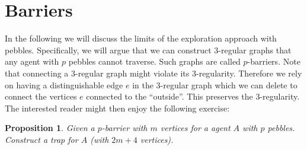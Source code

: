 \documentclass[draft,oneside]{scrartcl}
\newtheorem{prop}{Proposition}
\begin{document}
\section{Barriers}
In the following we will discuss the limits of the exploration approach with
pebbles. Specifically, we will argue that we can construct 3-regular graphs
that any agent with $p$ pebbles cannot traverse. Such graphs are called
$p$-barriers.
Note that connecting a 3-regular graph might violate its 3-regularity.
Therefore we rely on having a distinguishable edge $e$ in the 3-regular graph
which we can delete to connect the vertices $e$ connected to the
\enquote{outside}. This preserves the 3-regularity. The interested reader might
then enjoy the following exercise:
\begin{prop}
  Given a $p$-barrier with $m$ vertices for a agent $A$ with $p$ pebbles.
  Construct a trap for $A$ (with $2m+4$ vertices). 
\end{prop}
\end{document}
